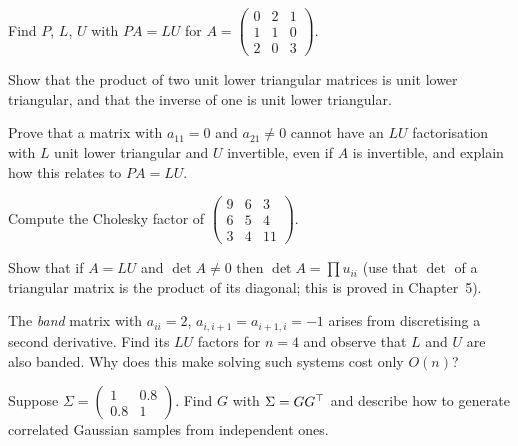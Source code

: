 \begin{exercise}
Find $P$, $L$, $U$ with $PA=LU$ for $A=\begin{pmatrix}0&2&1\\1&1&0\\2&0&3\end{pmatrix}$.
\end{exercise}

\begin{exercise}
Show that the product of two unit lower triangular matrices is unit lower triangular, and that the inverse of one is unit lower triangular.
\end{exercise}

\begin{exercise}
Prove that a matrix with $a_{11}=0$ and $a_{21}\ne0$ cannot have an $LU$ factorisation with $L$ unit lower triangular and $U$ invertible, even if $A$ is invertible, and explain how this relates to $PA=LU$.
\end{exercise}

\begin{exercise}
Compute the Cholesky factor of $\begin{pmatrix}9&6&3\\6&5&4\\3&4&11\end{pmatrix}$.
\end{exercise}

\begin{exercise}
Show that if $A=LU$ and $\det A\ne0$ then $\det A=\prod u_{ii}$ (use that $\det$ of a triangular matrix is the product of its diagonal; this is proved in Chapter~5).
\end{exercise}

\begin{exercise}
The \emph{band} matrix with $a_{ii}=2$, $a_{i,i+1}=a_{i+1,i}=-1$ arises from discretising a second derivative. Find its $LU$ factors for $n=4$ and observe that $L$ and $U$ are also banded. Why does this make solving such systems cost only $O(n)$?
\end{exercise}

\begin{exercise}
Suppose $\Sigma=\begin{pmatrix}1&0.8\\0.8&1\end{pmatrix}$. Find $G$ with $\Sigma=GG^{\top}$ and describe how to generate correlated Gaussian samples from independent ones.
\end{exercise}
